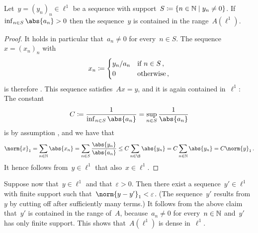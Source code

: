 \begin{claim}
  \label{sequence in image}
  Let~$y = (y_n)_n \in \ell^1$ be a sequence with support~$S \defined \{n \in \Natural \suchthat y_n \neq 0\}$.
  If~$\inf_{n \in S} \abs{a_n} > 0$ then the sequence~$y$ is contained in the range~$A(\ell^1)$.
\end{claim}

\begin{proof}
  It holds in particular that~$a_n \neq 0$ for every~$n \in S$.
  The sequence~$x = (x_n)_n$ with
  \[
              x_n
    \coloneqq  \begin{cases}
                y_n / a_n & \text{if~$n \in S$} \,, \\
                0         & \text{otherwise}  \,,
              \end{cases}
  \]
  is therefore {\welldef}.
  This sequence satisfies~$Ax = y$, and it is again contained in~$\ell^1$:
  The constant
  \[
              C
    \defined  \frac{1}{\inf_{n \in S} \abs{a_n}}
    =         \sup_{n \in S} \frac{1}{\abs{a_n}}
  \]
  is by assumption {\welldef}, and we have that
  \[
          \norm{x}_1
    =     \sum_{n \in \Natural} \abs{x_n}
    =     \sum_{n \in S} \frac{\abs{y_n}}{\abs{a_n}}
    \leq  C \sum_{n \in \S} \abs{y_n}
    =     C \sum_{n \in \Natural} \abs{y_n}
    =     C \norm{y}_1 \,.
  \]
  It hence follows from~$y \in \ell^1$ that also~$x \in \ell^1$.
\end{proof}


Suppose now that~$y \in \ell^1$ and that~$\varepsilon > 0$.
Then there exist a sequence~$y' \in \ell^1$ with finite support such that~$\norm{y - y'}_1 < \varepsilon$.
(The sequence~$y'$ results from~$y$ by cutting off after sufficiently many terms.)
It follows from the above claim that~$y'$ is contained in the range of~$A$, because~$a_n \neq 0$ for every~$n \in \mathbb{N}$ and~$y'$ has only finite support.
This shows that~$A(\ell^1)$ is dense in~$\ell^1$.





\subsection{}

